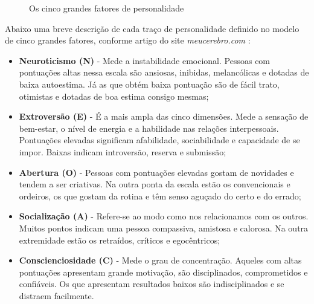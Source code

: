 \documentclass[
	article,			%
	11pt,				%
	oneside,			%
	a4paper,			%
	english,			%
	brazil,				%
	sumario=tradicional
	]{abntex2}
\begin{document}
\begin{figure}[H]
    \centering
    \caption{Os cinco grandes fatores de personalidade}
    \label{figura_BigFive}
\end{figure}

Abaixo uma breve descrição de cada traço de personalidade definido no modelo de cinco grandes fatores, conforme artigo do site \emph{meucerebro.com} \cite{webpage_BigFive}:

\begin{itemize}
    \item \textbf{Neuroticismo (N)} - Mede a instabilidade emocional. Pessoas com pontuações altas nessa escala são ansiosas, inibidas, melancólicas e dotadas de baixa autoestima. Já as que obtém baixa pontuação são de fácil trato, otimistas e dotadas de boa estima consigo mesmas;
    \item \textbf{Extroversão (E)} - É a mais ampla das cinco dimensões. Mede a sensação de bem-estar, o nível de energia e a habilidade nas relações interpessoais. Pontuações elevadas significam afabilidade, sociabilidade e capacidade de se impor. Baixas indicam introversão, reserva e submissão;
    
    \item \textbf{Abertura (O)} - Pessoas com pontuações elevadas gostam de novidades e tendem a ser criativas. Na outra ponta da escala estão os convencionais e ordeiros, os que gostam da rotina e têm senso aguçado do certo e do errado;
    \item \textbf{Socialização (A)} - Refere-se ao modo como nos relacionamos com os outros. Muitos pontos indicam uma pessoa compassiva, amistosa e calorosa. Na outra extremidade estão os retraídos, críticos e egocêntricos;
    \item \textbf{Conscienciosidade (C)} - Mede o grau de concentração. Aqueles com altas pontuações apresentam grande motivação, são disciplinados, comprometidos e confiáveis. Os que apresentam resultados baixos são indisciplinados e se distraem facilmente.
\end{itemize}
\end{document}
